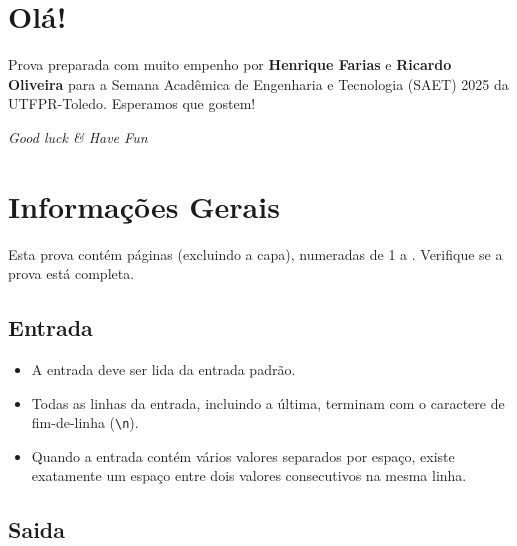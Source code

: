 \section*{Olá!}

Prova preparada com muito empenho por \textbf{Henrique Farias} e \textbf{Ricardo
    Oliveira} para a Semana Acadêmica de Engenharia e Tecnologia (SAET) 2025 da
    UTFPR-Toledo. Esperamos que gostem!\\

\begin{center}
\textit{Good luck \& Have Fun}
\end{center}

\newpage

\section*{Informações Gerais}

Esta prova contém \pageref*{lastpage} páginas (excluindo a capa), numeradas de 1 a \pageref*{lastpage}. Verifique se a prova está completa.

\subsection*{Entrada}

\begin{itemize}
   \item A entrada deve ser lida da entrada padrão.

	\item Todas as linhas da entrada, incluindo a última, terminam com o caractere de fim-de-linha (\texttt{\textbackslash n}).

	\item Quando a entrada contém vários valores separados por espaço, existe exatamente um espaço entre dois valores consecutivos na mesma linha.

\end{itemize}

\subsection*{Saida}

